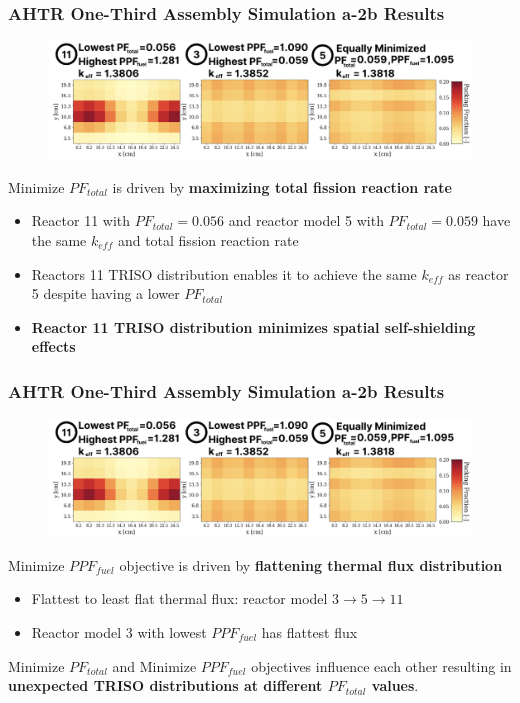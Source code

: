 \begin{frame}
    \frametitle{AHTR One-Third Assembly Simulation a-2b Results}
    \begin{figure}
        \centering
        \includegraphics[width=\linewidth]{figures/a-2b-comparison-reactors.png}
    \end{figure}

    Minimize $PF_{total}$ is driven by \textbf{maximizing total fission reaction rate} 
    \begin{itemize}
        \item Reactor 11 with $PF_{total} = 0.056$ and reactor model 5 with 
        $PF_{total} = 0.059$ have the same $k_{eff}$ and total fission reaction rate 
        \item Reactors 11 TRISO distribution enables it to achieve the same $k_{eff}$ 
        as reactor 5 despite having a lower $PF_{total}$
        \item \textbf{Reactor 11 TRISO distribution minimizes spatial self-shielding 
        effects}
    \end{itemize}
\end{frame}

\begin{frame}
    \frametitle{AHTR One-Third Assembly Simulation a-2b Results}
    \begin{figure}
        \centering
        \includegraphics[width=\linewidth]{figures/a-2b-comparison-reactors.png}
    \end{figure}

    Minimize $PPF_{fuel}$ objective is driven by \textbf{flattening thermal 
    flux distribution}  
    \begin{itemize}
        \item Flattest to least flat thermal flux: reactor model 
                $3 \rightarrow 5 \rightarrow 11$
        \item Reactor model 3 with lowest $PPF_{fuel}$ has flattest flux
    \end{itemize}

    \begin{tcolorbox}[colback=illiniorange,colframe=illiniorange!50!black]
        Minimize $PF_{total}$ and Minimize $PPF_{fuel}$ objectives 
        influence each other resulting in \textbf{unexpected TRISO distributions at 
        different $PF_{total}$ values}. 
    \end{tcolorbox}
\end{frame}

